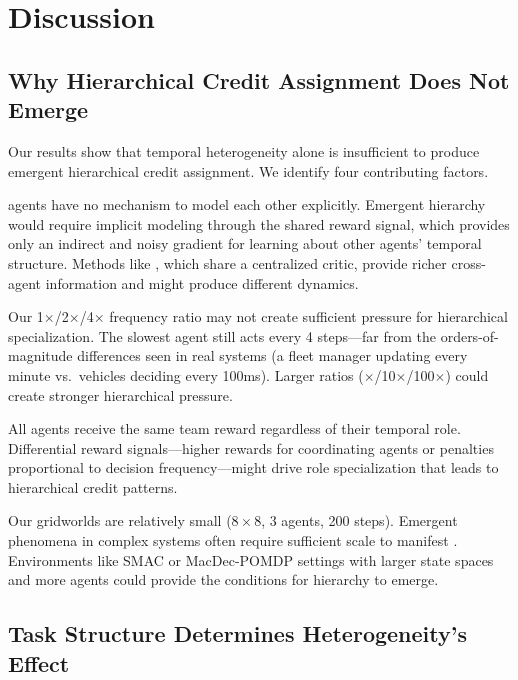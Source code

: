 \section{Discussion}
\label{sec:discussion}

\subsection{Why Hierarchical Credit Assignment Does Not Emerge}

Our results show that temporal heterogeneity alone is insufficient to produce emergent hierarchical credit assignment. We identify four contributing factors.

 \ippo agents have no mechanism to model each other explicitly. Emergent hierarchy would require implicit modeling through the shared reward signal, which provides only an indirect and noisy gradient for learning about other agents' temporal structure. Methods like \mappo, which share a centralized critic, provide richer cross-agent information and might produce different dynamics.

 Our 1$\times$/2$\times$/4$\times$ frequency ratio may not create sufficient pressure for hierarchical specialization. The slowest agent still acts every 4 steps---far from the orders-of-magnitude differences seen in real systems (\eg a fleet manager updating every minute vs.\ vehicles deciding every 100ms). Larger ratios ($\times$/10$\times$/100$\times$) could create stronger hierarchical pressure.

 All agents receive the same team reward regardless of their temporal role. Differential reward signals---\eg higher rewards for coordinating agents or penalties proportional to decision frequency---might drive role specialization that leads to hierarchical credit patterns.

 Our gridworlds are relatively small ($8 \times 8$, 3 agents, 200 steps). Emergent phenomena in complex systems often require sufficient scale to manifest \citep{mahajan2019maven}. Environments like SMAC \citep{rashid2018qmix} or MacDec-POMDP settings \citep{amato2019modeling} with larger state spaces and more agents could provide the conditions for hierarchy to emerge.

\subsection{Task Structure Determines Heterogeneity's Effect}

